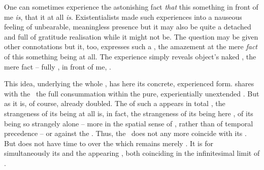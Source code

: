 One can sometimes experience the astonishing fact {\em that} this something in front
of me {\em is}, that it at all {\em is}. Existentialists made such experiences
into a nauseous feeling of unbearable, meaningless presence but it may also be quite
a detached and full of gratitude realisation  while it might not
be. The question  may be given
other connotations but it, too, expresses such a
, the amazement at the mere {\em fact} of this something being at
all.  The experience simply reveals object's naked ,
the mere fact %
 -- fully , in front of me, . 

This idea, underlying the whole , has here its
concrete, experienced form.   shares with the
\oss\ the full consummation within the pure, experientially unextended
.  But as  it is, of course, already doubled. The
 of such a  appears in total , the
strangeness of its being at all is, in fact, the strangeness of its being here
, of its being so strangely alone  -- more in the
spatial sense of , rather than of temporal precedence -- or
against the . Thus, the \rs\ does not any more coincide with
its . But  does not have time to  over the
 which remains merely . It is for 
simultaneously its  and the appearing , both coinciding in
the infinitesimal limit of .




